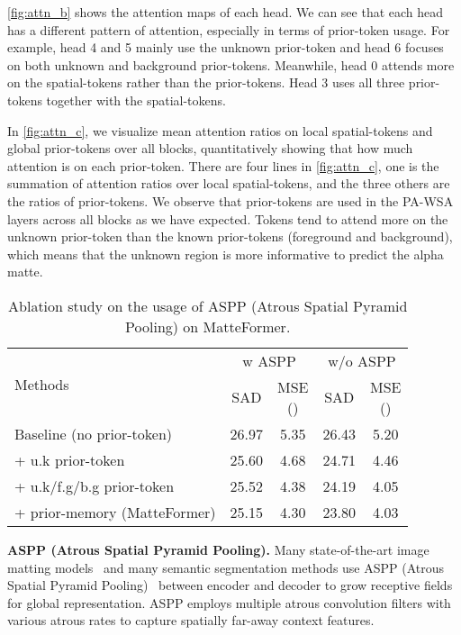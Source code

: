 \documentclass[10pt,twocolumn,letterpaper]{article}
\begin{document}
\cref{fig:attn_b} shows the attention maps of each head. We can see that each head has a different pattern of attention, especially in terms of prior-token usage. For example, head 4 and 5 mainly use the unknown prior-token and head 6 focuses on both unknown and background prior-tokens. Meanwhile, head 0 attends more on the spatial-tokens rather than the prior-tokens. Head 3 uses all three prior-tokens together with the spatial-tokens.

In \cref{fig:attn_c}, we visualize mean attention ratios on local spatial-tokens and global prior-tokens over all blocks, quantitatively showing that how much attention is on each prior-token. There are four lines in \cref{fig:attn_c}, one is the summation of attention ratios over local spatial-tokens, and the three others are the ratios of prior-tokens.
We observe that prior-tokens are used in the PA-WSA layers across all blocks as we have expected.
Tokens tend to attend more on the unknown prior-token than the known prior-tokens (foreground and background), which means that the unknown region is more informative to predict the alpha matte.

\label{sec:ASPP}

\begin{table}
   \begin{adjustbox}{width = \linewidth}
   \begin{tabular}{l | c c c c}
        \toprule
        \multirow{2}{*}{Methods} & \multicolumn{2}{c}{w ASPP} & \multicolumn{2}{c}{w/o ASPP} \\
        & SAD & \makecell{MSE \\ ()} & SAD & \makecell{MSE \\ ()} \\
        \hline
        Baseline (no prior-token) & 26.97 & 5.35 & 26.43 & 5.20 \\
        + u.k prior-token & 25.60 & 4.68 & 24.71 & 4.46 \\
        + u.k/f.g/b.g prior-token & 25.52 & 4.38 & 24.19 & 4.05 \\
        + prior-memory (MatteFormer) & 25.15 & 4.30 & 23.80 & 4.03 \\
        \bottomrule
    \end{tabular}
    \end{adjustbox}
    \caption{Ablation study on the usage of ASPP (Atrous Spatial Pyramid Pooling) on MatteFormer.}
    \label{tab:aspp}
\end{table}

\vspace{2mm}
\textbf{ASPP (Atrous Spatial Pyramid Pooling).} 
Many state-of-the-art image matting models~\cite{qiao2020attention, lin2021real, yu2021mask, sun2021semantic, liu2021tripartite} and many semantic segmentation methods use ASPP (Atrous Spatial Pyramid Pooling)~\cite{chen2017deeplab} between encoder and decoder to grow receptive fields for global representation. ASPP employs multiple atrous convolution filters with various atrous rates to capture spatially far-away context features. 
\end{document}
